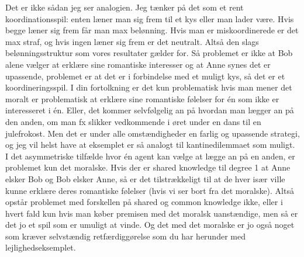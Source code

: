 \documentclass[a4paper]{article}
\newenvironment{tsn}{\smallskip \noindent \color{purple}}{\color{black}\smallskip}
\newenvironment{tobo}{\smallskip \noindent \color{yellow!80!black!80}}{\color{black}\smallskip}
\begin{document}
\begin{tsn}
\begin{tobo}
Det er ikke sådan jeg ser analogien. Jeg tænker på det som et rent koordinationsspil: enten læner man sig frem til et kys eller man lader være. Hvis begge læner sig frem får man max belønning. Hvis man er miskoordinerede er det max straf, og hvis ingen læner sig frem er det neutralt. Altså den slags belønningsstruktur som vores resultater gælder for. Så problemet er ikke at Bob alene vælger at erklære sine romantiske interesser og at Anne synes det er upassende, problemet er at det er i forbindelse med et muligt kys, så det er et koordineringsspil. I din fortolkning er det kun problematisk hvis man mener det moralt er problematisk at erklære sine romantiske følelser for én som ikke er interesseret i én. Eller, det kommer selvfølgelig an på hvordan man lægger an på den anden, om man fx slikker vedkommende i øret under en dans til en julefrokost. Men det er under alle omstændigheder en farlig og upassende strategi, og jeg vil helst have at eksemplet er så analogt til kantinedilemmaet som muligt. I det asymmetriske tilfælde hvor én agent kan vælge at lægge an på en anden, er problemet kun det moralske. Hvis der er shared knowledge til degree 1 at Anne elsker Bob og Bob elsker Anne, så er det tilstrækkeligt til at de hver især ville kunne erklære deres romantiske følelser (hvis vi ser bort fra det moralske). Altså opstår problemet med forskellen på shared og common knowledge ikke, eller i hvert fald kun hvis man køber premisen med det moralsk uanstændige, men så er det jo et spil som er umuligt at vinde. Og det med det moralske er jo også noget som kræver selvstændig retfærdiggørelse som du har herunder med lejlighedseksemplet. 
\end{tobo} 
 

\end{tsn}
\end{document}
